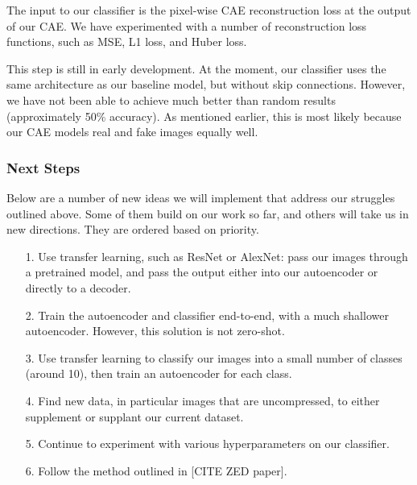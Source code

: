 \documentclass{article} %
\begin{document}
The input to our classifier is the pixel-wise CAE reconstruction loss at the output of our CAE. We have experimented with a number of reconstruction loss functions, such as MSE, L1 loss, and Huber loss.

This step is still in early development. At the moment, our classifier uses the same architecture as our baseline model, but without skip connections. However, we have not been able to achieve much better than random results (approximately 50\% accuracy). As mentioned earlier, this is most likely because our CAE models real and fake images equally well.

\subsubsection{Next Steps}
\label{next_steps}

Below are a number of new ideas we will implement that address our struggles outlined above. Some of them build on our work so far, and others will take us in new directions. They are ordered based on priority.

\begin{itemize}
    \item[1.] Use transfer learning, such as ResNet or AlexNet: pass our images through a pretrained model, and pass the output either into our autoencoder or directly to a decoder.
    \item[2.] Train the autoencoder and classifier end-to-end, with a much shallower autoencoder. However, this solution is not zero-shot.
    \item[3.] Use transfer learning to classify our images into a small number of classes (around 10), then train an autoencoder for each class. 
    \item[4.] Find new data, in particular images that are uncompressed, to either supplement or supplant our current dataset.
    \item[5.] Continue to experiment with various hyperparameters on our classifier.
    \item[6.] Follow the method outlined in [CITE ZED paper].
\end{itemize}

\label{last_page}



\end{document}
